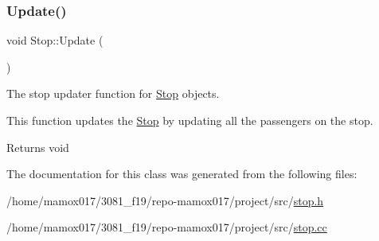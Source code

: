 \subsubsection{\texorpdfstring{Update()}{Update()}}
{\footnotesize\ttfamily void Stop\+::\+Update (\begin{DoxyParamCaption}{ }\end{DoxyParamCaption})}



The stop updater function for \hyperlink{classStop}{Stop} objects. 

This function updates the \hyperlink{classStop}{Stop} by updating all the passengers on the stop.

\begin{DoxyReturn}{Returns}
void 
\end{DoxyReturn}


The documentation for this class was generated from the following files\+:\begin{DoxyCompactItemize}
\item 
/home/mamox017/3081\+\_\+f19/repo-\/mamox017/project/src/\hyperlink{stop_8h}{stop.\+h}\item 
/home/mamox017/3081\+\_\+f19/repo-\/mamox017/project/src/\hyperlink{stop_8cc}{stop.\+cc}\end{DoxyCompactItemize}
